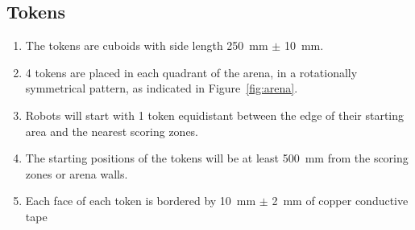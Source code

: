 \subsection{Tokens}
\label{spec:tokens}

\begin{enumerate}
  \item The tokens are cuboids with side length \SI{250}{mm} $\pm$ \SI{10}{mm}.
  \item 4 tokens are placed in each quadrant of the arena, in a rotationally
        symmetrical pattern, as indicated in Figure~\ref{fig:arena}.
  \item Robots will start with 1 token equidistant between the edge of their
        starting area and the nearest scoring zones.
  \item The starting positions of the tokens will be at least \SI{500}{mm} from the
        scoring zones or arena walls.
  \item Each face of each token is bordered by \SI{10}{mm} $\pm$ \SI{2}{mm} of
        copper conductive tape
\end{enumerate}
